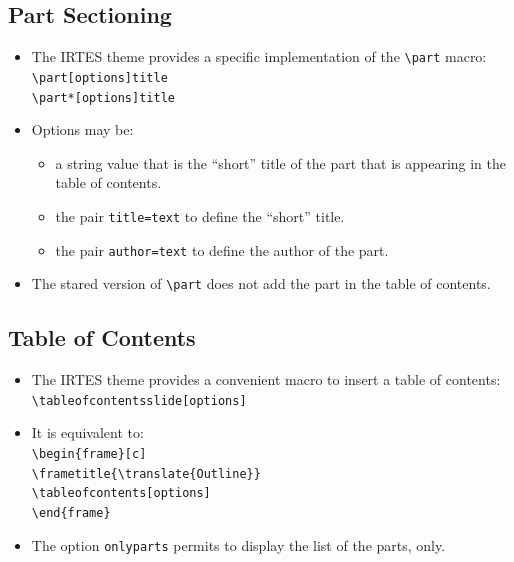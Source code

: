 \documentclass[english,circlenumberstyle]{irtesbeamer}
\begin{document}
\subsection{Part Sectioning}
\begin{frame}{\subsecname}
	\begin{itemize}
	\item The IRTES theme provides a specific implementation of the \texttt{{\textbackslash}part} macro: \\
		\texttt{{\textbackslash}part[options]{title}} \\
		\texttt{{\textbackslash}part*[options]{title}} \\
	\item Options may be: \begin{itemize}
		\item a string value that is the ``short'' title of the part that is appearing in the table of contents.
		\item the pair \texttt{title=text} to define the ``short'' title.
		\item the pair \texttt{author=text} to define the author of the part.
		\end{itemize}
	\item The stared version of \texttt{{\textbackslash}part} does not add the part in the table of contents.
	\end{itemize}
\end{frame}

\subsection{Table of Contents}
\begin{frame}{\subsecname}
	\begin{itemize}
	\item The IRTES theme provides a convenient macro to insert a table of contents: \\
		\texttt{{\textbackslash}tableofcontentsslide[options]}
	\item It is equivalent to: \\
		\texttt{{\textbackslash}begin\{frame\}[c]} \\
		\texttt{{\textbackslash}frametitle\{{\textbackslash}translate\{Outline\}\}} \\
		\texttt{{\textbackslash}tableofcontents[options]} \\
		\texttt{{\textbackslash}end\{frame\}}
	\item The option \texttt{onlyparts} permits to display the list of the parts, only.
	\end{itemize}
\end{frame}
\end{document}
